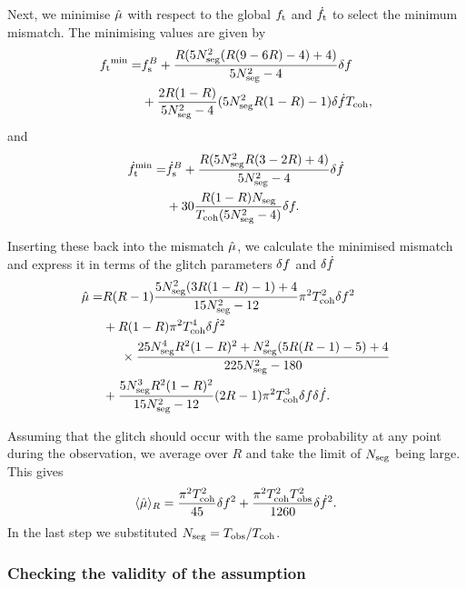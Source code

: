 \documentclass[../full_thesis/full_thesis.tex]{subfiles}
\begin{document}
Next, we minimise $\hat{\mu}$ with respect to the global ${f_{\textrm{t}}}$ and $\dot{f}_{\textrm{t}}$ to
select the minimum mismatch. The minimising values are given by
\begin{align}
\begin{split}
{f_{\textrm{t}}}^{\textrm{min}}  = & f_{\textrm{s}}^{B}
+ \frac{R(5N_{\textrm{seg}}^{2}(R(9-6R)-4) + 4)}{5N_{\textrm{seg}}^{2}-4}\delta f \\
& + \frac{2R(1-R)}{5N_{\textrm{seg}}^{2}-4}(5N_{\textrm{seg}}^{2}R(1-R)-1)\delta\dot{f}T_{\mathrm{coh}},
\end{split}
\end{align}
and
\begin{align}
\begin{split}
\dot{f}_{\textrm{t}}^{\textrm{min}} = & \dot{f}_{\textrm{s}}^{B}
+ \frac{R(5N_{\textrm{seg}}^{2}R(3-2R)+ 4)}{5N_{\textrm{seg}}^{2}-4}\delta\dot{f} \\
& + 30\frac{R(1-R)N_{\textrm{seg}}}{T_{\mathrm{coh}}(5N_{\textrm{seg}}^{2} - 4)}\delta f.
\end{split}
\end{align}

Inserting these back into the mismatch $\hat{\mu}$, we calculate the minimised
mismatch and express it in terms of the glitch parameters $\delta f$ and
$\delta\dot{f}$
\begin{align}
\begin{split}
\hat{\mu} = & R(R-1)\frac{5N_{\textrm{seg}}^{2}(3R(1-R)-1) + 4}{15N_{\textrm{seg}}^{2}-12}\pi^{2}
            T_{\mathrm{coh}}^{2}\delta f^{2} \\
& + R(1-R)\pi^{2}T_{\mathrm{coh}}^{4}\delta\dot{f}^{2} \\
& \hspace{5mm}\times\frac{25N_{\textrm{seg}}^{4}R^{2}(1-R)^{2} + N_{\textrm{seg}}^{2}(5R(R-1)-5) + 4}{225N_{\textrm{seg}}^{2}-180} \\
& + \frac{5N_{\textrm{seg}}^{3}R^{2}(1-R)^{2}}{15N_{\textrm{seg}}^{2}-12}(2R-1)
   \pi^{2}T_{\mathrm{coh}}^{3}\delta f\delta\dot{f}.
\end{split}
\label{eqn: mu semi-coherent R}
\end{align}

Assuming that the glitch should occur with the same probability at any point
during the observation, we average over $R$ and take the limit of $N_{\textrm{seg}}$ being
large. This gives
\begin{align}
\langle\hat{\mu}\rangle_{R} = \frac{\pi^{2}T_{\mathrm{coh}}^{2}}{45}\delta f^{2}
      + \frac{\pi^{2}T_{\mathrm{coh}}^{2}T_{\mathrm{obs}}^{2}}{1260}\delta\dot{f}^{2}.
\label{eqn: R-averaged semi-coherent}
\end{align}
In the last step we substituted $N_{\textrm{seg}}=T_{\mathrm{obs}}/T_{\mathrm{coh}}$.

\subsubsection{Checking the validity of the assumption}
\end{document}
